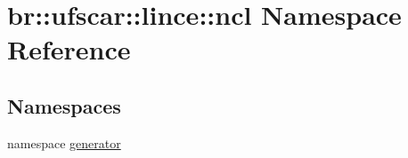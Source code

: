 \hypertarget{namespacebr_1_1ufscar_1_1lince_1_1ncl}{
\section{br::ufscar::lince::ncl Namespace Reference}
\label{namespacebr_1_1ufscar_1_1lince_1_1ncl}
}
\subsection*{Namespaces}
\begin{DoxyCompactItemize}
\item 
namespace \hyperlink{namespacebr_1_1ufscar_1_1lince_1_1ncl_1_1generator}{generator}
\end{DoxyCompactItemize}
